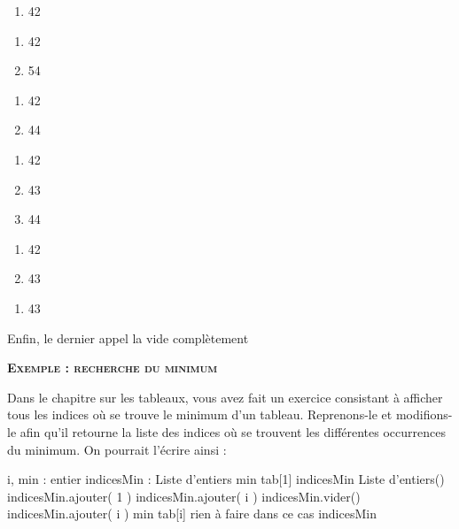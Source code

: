 \begin{minipage}[t]{2cm}
\begin{enumerate}
\item 42
\end{enumerate}
\end{minipage}
\begin{minipage}[t]{2cm}
\begin{enumerate}
\item 42
\item 54
\end{enumerate}
\end{minipage}
\begin{minipage}[t]{2cm}
\begin{enumerate}
\item 42
\item 44
\end{enumerate}
\end{minipage}
\begin{minipage}[t]{2cm}
\begin{enumerate}
\item 42
\item 43
\item 44
\end{enumerate}
\end{minipage}
\begin{minipage}[t]{2cm}
\begin{enumerate}
\item 42
\item 43
\end{enumerate}
\end{minipage}
\begin{minipage}[t]{2cm}
\begin{enumerate}
\item 43
\end{enumerate}
\end{minipage}

Enfin, le dernier appel la vide complètement

\bigskip
{\sffamily\bfseries\scshape
Exemple : recherche du minimum}

Dans le chapitre sur les tableaux, vous avez fait un exercice consistant
à afficher tous les indices où se trouve le minimum d’un tableau.
Reprenons-le et modifions-le afin qu’il retourne la liste des indices
où se trouvent les différentes occurrences du minimum. On pourrait
l’écrire ainsi :

\begin{Pseudocode}
		\Decl i, min : entier
		\Decl indicesMin : Liste d'entiers
		\Let min \Gets tab[1]
		\Let indicesMin \Gets {} Liste d'entiers()
		\Stmt indicesMin.ajouter( 1 )
			\Switch{} 
					\Stmt indicesMin.ajouter( i )
					\Stmt indicesMin.vider() 
					\Stmt indicesMin.ajouter( i )
					\Let min \Gets tab[i]
					\LComment rien à faire dans ce cas	
			\EndSwitch
		\EndFor
		\Return indicesMin
	\EndModule
\end{Pseudocode}

